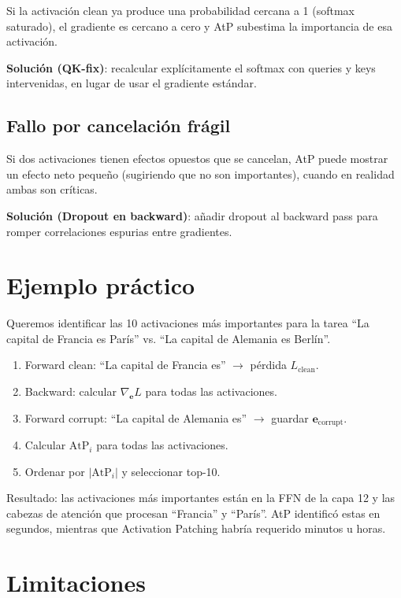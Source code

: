 \documentclass[11pt,a4paper]{report}
\theoremstyle{definition}
\begin{document}
Si la activación clean ya produce una probabilidad cercana a 1 (softmax saturado), el gradiente es cercano a cero y AtP subestima la importancia de esa activación.

\textbf{Solución (QK-fix)}: recalcular explícitamente el softmax con queries y keys intervenidas, en lugar de usar el gradiente estándar.

\subsection{Fallo por cancelación frágil}

Si dos activaciones tienen efectos opuestos que se cancelan, AtP puede mostrar un efecto neto pequeño (sugiriendo que no son importantes), cuando en realidad ambas son críticas.

\textbf{Solución (Dropout en backward)}: añadir dropout al backward pass para romper correlaciones espurias entre gradientes.

\section{Ejemplo práctico}

Queremos identificar las 10 activaciones más importantes para la tarea ``La capital de Francia es París'' vs. ``La capital de Alemania es Berlín''.

\begin{enumerate}
    \item Forward clean: ``La capital de Francia es'' $\rightarrow$ pérdida $L_{\text{clean}}$.
    \item Backward: calcular $\nabla_{\mathbf{e}} L$ para todas las activaciones.
    \item Forward corrupt: ``La capital de Alemania es'' $\rightarrow$ guardar $\mathbf{e}_{\text{corrupt}}$.
    \item Calcular $\text{AtP}_i$ para todas las activaciones.
    \item Ordenar por $|\text{AtP}_i|$ y seleccionar top-10.
\end{enumerate}

Resultado: las activaciones más importantes están en la FFN de la capa 12 y las cabezas de atención que procesan ``Francia'' y ``París''. AtP identificó estas en segundos, mientras que Activation Patching habría requerido minutos u horas.

\section{Limitaciones}
\end{document}
